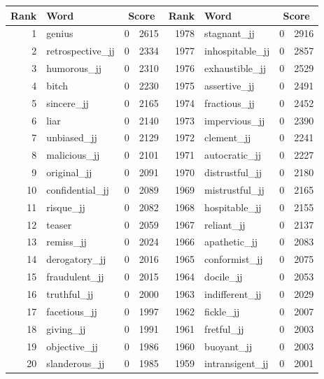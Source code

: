 \begin{table}[tbp]
    \begin{tabular}{| rlr@{.}l | rlr@{.}l |}
    \hline
    \textbf{Rank} & \textbf{Word} & \multicolumn{2}{c|}{\textbf{Score}} & \textbf{Rank} & \textbf{Word} & \multicolumn{2}{c|}{\textbf{Score}} \\
    \hline
    1 & genius & 0 & 2615    &    1978 & stagnant\_jj & 0 & 2916 \\
    2 & retrospective\_jj & 0 & 2334    &    1977 & inhospitable\_jj & 0 & 2857 \\
    3 & humorous\_jj & 0 & 2310    &    1976 & exhaustible\_jj & 0 & 2529 \\
    4 & bitch & 0 & 2230    &    1975 & assertive\_jj & 0 & 2491 \\
    5 & sincere\_jj & 0 & 2165    &    1974 & fractious\_jj & 0 & 2452 \\
    6 & liar & 0 & 2140    &    1973 & impervious\_jj & 0 & 2390 \\
    7 & unbiased\_jj & 0 & 2129    &    1972 & clement\_jj & 0 & 2241 \\
    8 & malicious\_jj & 0 & 2101    &    1971 & autocratic\_jj & 0 & 2227 \\
    9 & original\_jj & 0 & 2091    &    1970 & distrustful\_jj & 0 & 2180 \\
    10 & confidential\_jj & 0 & 2089    &    1969 & mistrustful\_jj & 0 & 2165 \\
    11 & risque\_jj & 0 & 2082    &    1968 & hospitable\_jj & 0 & 2155 \\
    12 & teaser & 0 & 2059    &    1967 & reliant\_jj & 0 & 2137 \\
    13 & remiss\_jj & 0 & 2024    &    1966 & apathetic\_jj & 0 & 2083 \\
    14 & derogatory\_jj & 0 & 2016    &    1965 & conformist\_jj & 0 & 2075 \\
    15 & fraudulent\_jj & 0 & 2015    &    1964 & docile\_jj & 0 & 2053 \\
    16 & truthful\_jj & 0 & 2000    &    1963 & indifferent\_jj & 0 & 2029 \\
    17 & facetious\_jj & 0 & 1997    &    1962 & fickle\_jj & 0 & 2007 \\
    18 & giving\_jj & 0 & 1991    &    1961 & fretful\_jj & 0 & 2003 \\
    19 & objective\_jj & 0 & 1986    &    1960 & buoyant\_jj & 0 & 2003 \\
    20 & slanderous\_jj & 0 & 1985    &    1959 & intransigent\_jj & 0 & 2001 \\

\end{tabular}
\end{table}
